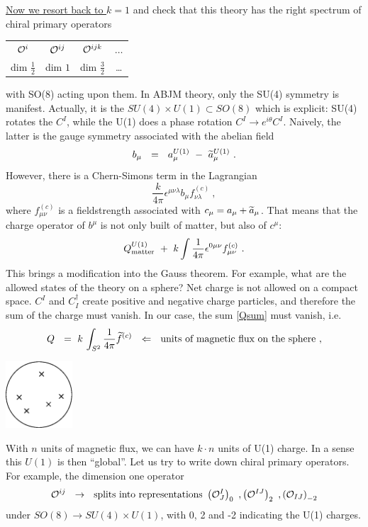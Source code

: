 \documentclass[12pt]{article}
\def\be{\begin{eqnarray}}\def\ba{\begin{eqnarray}}
\def\ee{\end{eqnarray}}\def\ea{\end{eqnarray}}
\begin{document}
\underline{Now we resort back to $ k = 1 $} and check that this theory has the right spectrum of chiral primary operators
\begin{center}
\begin{tabular}{cccc}
%
	$ \mathcal{O}^{i} $   & $ \mathcal{O}^{ij} $  &  $ \mathcal{O}^{ijk} $  & $ \dots $ \\
%
	{\small dim $\frac{1}{2} $}    &  {\small dim $ 1 $}     &  {\small dim $ \frac{3}{2} $} & \dots
\end{tabular}
\end{center}
with SO(8) acting upon them.
In ABJM theory, only the SU(4) symmetry is manifest. 
Actually, it is the $ SU(4) \times U(1) \subset SO(8) $ which is explicit: SU(4) rotates the $ C^I $, while the U(1) does a phase
rotation $ C^I \to e^{i\theta} C^I $.
Naively, the latter is the gauge symmetry associated with the abelian field
\[
	b_\mu ~~=~~ a_\mu^{U(1)} ~-~ \widetilde{a}_\mu^{U(1)}~.
\]
However, there is a Chern-Simons term in the Lagrangian
\[
	\frac{k}{4\pi} \epsilon^{\mu\nu\lambda} b_\mu f^{(c)}_{\nu\lambda} ~, 
\]
where $ f^{(c)}_{\mu\nu} $ is a fieldstrength associated with $ c_\mu = a_\mu + \widetilde{a}_\mu $.
That means that the charge operator of $ b^\mu $ is not only built of matter, but also of $ c^\mu $:
\be
\label{Qsum}
	Q_{\rm matter}^{U(1)} ~+~ k \int \frac{1}{4\pi} \epsilon^{0\mu\nu} f_{\mu\nu}^{(c)}~.
\ee
This brings a modification into the Gauss theorem.
For example, what are the allowed states of the theory on a sphere? 
Net charge is not allowed on a compact space. 
$ C^I $ and $ C_I^\dag $ create positive and negative charge particles, and
therefore the sum of the charge must vanish.
In our case, the sum \eqref{Qsum} must vanish, i.e.
\[
	Q ~~=~ k\, \int_{S^2} \frac{1}{4\pi} \widetilde{f}{}^{(c)} ~~\Leftarrow~~ \text{units of magnetic flux on the sphere}~,
\]
\begin{center}
\includegraphics[width=2.5cm]{sphere.eps}
\end{center}
With $ n $ units of magnetic flux, we can have $ k \cdot n $ units of U(1) charge.
In a sense this $ U(1) $ is then ``global''.
Let us try to write down chiral primary operators.
For example, the dimension one operator
\[
	\mathcal{O}^{ij} ~~\to~~ \text{splits into representations}~ \left(\mathcal{O}^I_J\right)_0 ~, \left(\mathcal{O}^{IJ}\right)_2 ~,  \left(\mathcal{O}_{IJ}\right)_{-2}
\]
under $ SO(8) \to SU(4) \times U(1) $, with 0, 2 and -2 indicating the U(1) charges.
\end{document}
